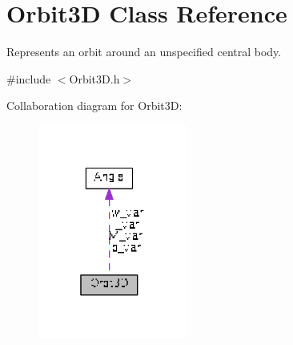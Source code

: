 \hypertarget{class_orbit3_d}{\section{Orbit3\+D Class Reference}
\label{class_orbit3_d}
}


Represents an orbit around an unspecified central body.  




{\ttfamily \#include $<$Orbit3\+D.\+h$>$}



Collaboration diagram for Orbit3\+D\+:\nopagebreak
\begin{figure}[H]
\begin{center}
\leavevmode
\includegraphics[width=139pt]{class_orbit3_d__coll__graph}
\end{center}
\end{figure}
